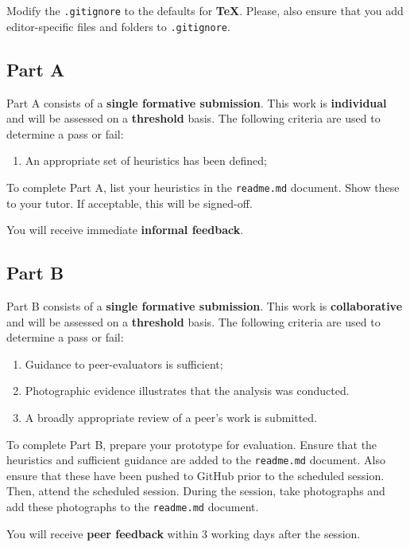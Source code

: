 \documentclass{../fal_assignment}
\begin{document}
Modify the \texttt{.gitignore} to the defaults for \textbf{TeX}. Please, also ensure that you add editor-specific files and folders to \texttt{.gitignore}. 

\subsection*{Part A}

Part A consists of a \textbf{single formative submission}. This work is \textbf{individual} and will be assessed on a \textbf{threshold} basis. The following criteria are used to determine a pass or fail:

\begin{enumerate}[label=(\alph*)]
	\item An appropriate set of heuristics has been defined;
\end{enumerate}

To complete Part A, list your heuristics in the \texttt{readme.md} document.  Show these to your tutor.  If acceptable, this will be signed-off. 

You will receive immediate \textbf{informal feedback}.

\subsection*{Part B}

Part B consists of a \textbf{single formative submission}. This work is \textbf{collaborative} and will be assessed on a \textbf{threshold} basis. The following criteria are used to determine a pass or fail:

\begin{enumerate}[label=(\alph*)]
	\item Guidance to peer-evaluators is sufficient;
	\item Photographic evidence illustrates that the analysis was conducted.
	\item A broadly appropriate review of a peer's work is submitted.
\end{enumerate}

To complete Part B, prepare your prototype for evaluation. Ensure that the heuristics and sufficient guidance are added to the \texttt{readme.md} document. Also ensure that these have been pushed to GitHub prior to the scheduled session. Then, attend the scheduled session. During the session, take photographs and add these photographs to the \texttt{readme.md} document.

You will receive \textbf{peer feedback} within 3 working days after the session.
\end{document}
